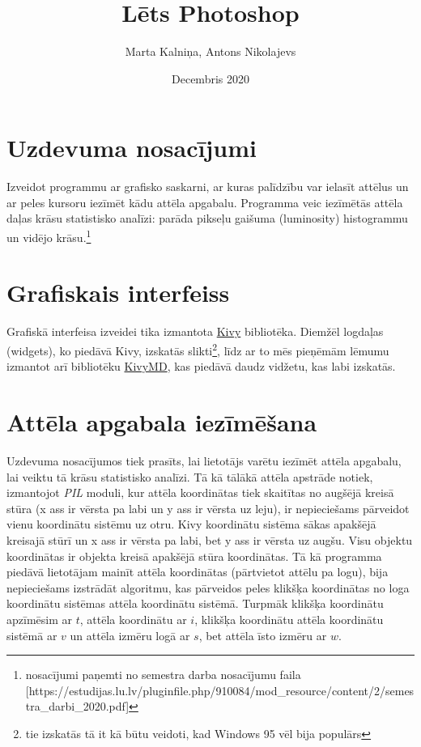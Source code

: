 \documentclass{article}
\title{Lēts Photoshop}
\author{Marta Kalniņa, Antons Nikolajevs }
\date{Decembris 2020}
\begin{document}
\maketitle

\section{Uzdevuma nosacījumi}
Izveidot programmu ar grafisko saskarni, ar kuras palīdzību var ielasīt attēlus un ar peles kursoru iezīmēt kādu attēla apgabalu. Programma veic iezīmētās attēla daļas krāsu statistisko analīzi: parāda pikseļu gaišuma (luminosity) histogrammu un vidējo krāsu.\footnote{nosacījumi paņemti no 
semestra darba nosacījumu faila [https://estudijas.lu.lv/pluginfile.php/910084/mod_resource/content/2/semestra_darbi_2020.pdf]}
\section{Grafiskais interfeiss}
Grafiskā interfeisa izveidei tika izmantota \href{https://kivy.org/#home}{Kivy} bibliotēka. Diemžēl logdaļas (widgets), ko piedāvā Kivy, izskatās slikti\footnote{tie izskatās tā it kā būtu veidoti, kad Windows 95 vēl bija populārs}, līdz ar to mēs pieņēmām lēmumu izmantot arī bibliotēku \href{https://github.com/kivymd/KivyMD}{KivyMD}, kas piedāvā daudz vidžetu, kas labi izskatās.

\section{Attēla apgabala iezīmēšana}
Uzdevuma nosacījumos tiek prasīts, lai lietotājs varētu iezīmēt attēla apgabalu, lai veiktu tā krāsu statistisko analīzi.
Tā kā tālākā attēla apstrāde notiek, izmantojot \textit{PIL} moduli, kur attēla koordinātas tiek skaitītas no augšējā kreisā stūra (x ass ir vērsta pa labi un y ass ir vērsta uz leju), ir nepieciešams pārveidot vienu koordinātu sistēmu uz otru. Kivy koordinātu sistēma sākas apakšējā kreisajā stūrī un x ass ir vērsta pa labi, bet y ass ir vērsta uz augšu. Visu objektu koordinātas ir objekta kreisā apakšējā stūra koordinātas. Tā kā programma piedāvā lietotājam mainīt attēla koordinātas (pārtvietot attēlu pa logu), bija nepieciešams izstrādāt algoritmu, kas pārveidos peles klikšķa koordinātas no loga koordinātu sistēmas attēla koordinātu sistēmā. Turpmāk klikšķa koordinātu apzīmēsim ar $t$, attēla koordinātu ar $i$, klikšķa koordinātu attēla koordinātu sistēmā ar $v$ un attēla izmēru logā ar $s$, bet attēla īsto izmēru ar $w$.
\end{document}
